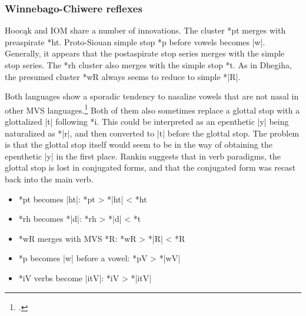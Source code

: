 \documentclass[output=paper]{LSP/langsci}
\begin{document}
\subsubsection{Winnebago-Chiwere reflexes}

Hooc\k{a}k and IOM share a number of innovations.  The cluster *pt merges with preaspirate *ht.  Proto-Siouan simple stop *p before vowels becomes |w|.  Generally, it appears that the postaspirate stop series merges with the simple stop series.  The *rh cluster also merges with the simple stop *t.  As in Dhegiha, the presumed cluster *wR always seems to reduce to simple *|R|.  

Both languages show a sporadic tendency to nasalize vowels that are not nasal in other MVS languages.\footnote{\citealt[50]{Rankinetal2006PDF}.} Both of them also sometimes replace a glottal stop with a glottalized |t\textsuperscript{}| following *i.  This could be interpreted as an epenthetic |y| being naturalized as *|r|, and then converted to |t| before the glottal stop.  The problem is that the glottal stop itself would seem to be in the way of obtaining the epenthetic |y| in the first place.  Rankin suggests that in verb paradigms, the glottal stop is lost in conjugated forms, and that the conjugated form was recast back into the main verb.

\begin{itemize}
\item *pt becomes |ht|: \hspace{7em} *pt	>	*|ht|	<	*ht
\item *rh becomes *|d|: \hspace{7em} *rh	>	*|d|	<	*t
\item *wR merges with MVS *R: \hspace{3em} *wR	>	*|R|	<	*R
\item *p becomes |w| before a vowel: \hspace{1em} *pV	>	*|wV|
\item *i\textsuperscript{}V verbs become |it\textsuperscript{}V|:	\hspace{4em} *i\textsuperscript{}V	>	*|it\textsuperscript{}V|
\end{itemize}
 
\end{document}
